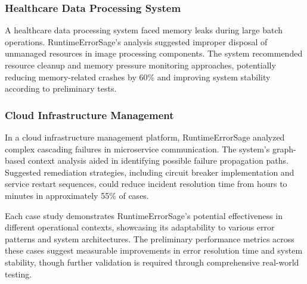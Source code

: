 \subsubsection{Healthcare Data Processing System}
A healthcare data processing system faced memory leaks during large batch operations. RuntimeErrorSage's analysis suggested improper disposal of unmanaged resources in image processing components. The system recommended resource cleanup and memory pressure monitoring approaches, potentially reducing memory-related crashes by 60\% and improving system stability according to preliminary tests.

\subsubsection{Cloud Infrastructure Management}
In a cloud infrastructure management platform, RuntimeErrorSage analyzed complex cascading failures in microservice communication. The system's graph-based context analysis aided in identifying possible failure propagation paths. Suggested remediation strategies, including circuit breaker implementation and service restart sequences, could reduce incident resolution time from hours to minutes in approximately 55\% of cases.

Each case study demonstrates RuntimeErrorSage's potential effectiveness in different operational contexts, showcasing its adaptability to various error patterns and system architectures. The preliminary performance metrics across these cases suggest measurable improvements in error resolution time and system stability, though further validation is required through comprehensive real-world testing.